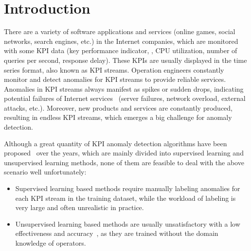 \section{Introduction}
\label{sec:introduction}
There are a variety of software applications and services (online games, social networks, search engines, etc.) in the Internet companies, which are monitored with some KPI data (key performance indicator, \EG, CPU utilization, number of queries per second, response delay). These KPIs are usually displayed in the time series format, also known as KPI streams. Operation engineers constantly monitor and detect anomalies for KPI streams to provide reliable services.
Anomalies in KPI streams always manifest as spikes or sudden drops, indicating potential failures of Internet services~\cite{chen2013provider,liu2015opprentice,zhang2015rapid} (server failures, network overload, external attacks, etc.).
Moreover, new products and services are constantly produced, %
resulting in endless KPI streams,
which emerges a big challenge for anomaly detection.


Although a great quantity of KPI anomaly detection algorithms have been proposed~\cite{chen2013provider,liu2015opprentice, knorn2008adaptive, pincombe2005anomaly, yan2012argus, lu2009network, egads, ding2013anomaly} over the years,
which are mainly divided into supervised learning and unsupervised learning methods, none of them are feasible to deal with the above scenario well unfortunately:
\begin{itemize}
  \item  
  Supervised learning based methods\cite{egads, liu2015opprentice} require manually labeling anomalies for each KPI stream in the training dataset, while the workload of labeling is very large and often unrealistic in practice.
  \item 
  Unsupervised learning based methods are usually unsatisfactory with a low effectiveness and accuracy~\cite{ding2013anomaly}, as they are trained without the domain knowledge of operators.
\end{itemize}

